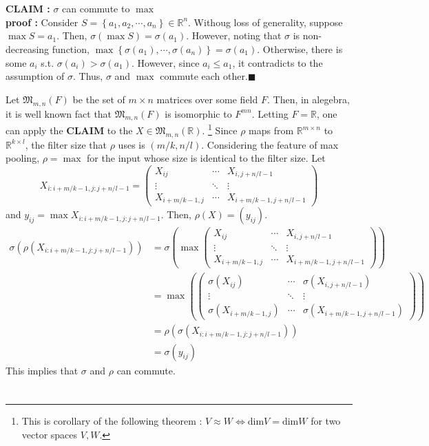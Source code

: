 \documentclass[10pt]{article}
\begin{document}
\section{}
\textbf{CLAIM : }$\sigma$ can commute to $\max$
\\
\textbf{proof : }
Consider $S = \left\{a_1,a_2,\cdots, a_n\right\}\in\mathbb{R}^n$. Withoug loss of generality, suppose $\max S = a_1$. Then, $\sigma(\max S) = \sigma(a_1)$. 
However, noting that $\sigma$ is non-decreasing function, $\max\left\{\sigma(a_1), \cdots,\sigma(a_n) \right\} = \sigma(a_1)$. Otherwise, there is some $a_i$ s.t. $\sigma(a_i) > \sigma(a_1)$. However, since $a_i\le a_1$, it contradicts to the assumption of $\sigma$.
Thus, $\sigma$ and $\max$ commute each other.$\blacksquare$

Let $\mathfrak{M}_{m,n}(F)$ be the set of $m\times n$ matrices over some field $F$. Then, in alegebra, it is well known fact that $\mathfrak{M}_{m,n}(F)$ is isomorphic to $F^{mn}$. Letting $F = \mathbb{R}$, one can apply the \textbf{CLAIM} to the $X\in\mathfrak{M}_{m,n}(\mathbb{R})$.
\footnote{This is corollary of the following theorem : $V \approx W \iff \text{dim}V = \text{dim}W$ for two vector spaces $V, W$.}
Since $\rho$ maps from $\mathbb{R}^{m\times n}$ to $\mathbb{R}^{k\times l}$, the filter size that $\rho$ uses is $(m/k, n/l)$. 
Considering the feature of max pooling, $\rho = \max$ for the input whose size is identical to the filter size. 
Let 
\begin{equation*}
    X_{i:i+m/k-1, j:j+n/l-1} = \begin{pmatrix}
        X_{ij} & \cdots & X_{i,j+n/l-1} \\ \vdots & \ddots & \vdots \\ X_{i+m/k-1,j} & \cdots & X_{i+m/k-1,j+n/l-1}
    \end{pmatrix}
\end{equation*}
and $y_{ij} = \max X_{i:i+m/k-1,j:j+n/l-1}$. Then, $\rho(X) = (y_{ij})$. 
\begin{align*}
    \sigma(\rho(X_{i:i+m/k-1,j:j+n/l-1})) &= \sigma\left(\max \begin{pmatrix}X_{ij} & \cdots & X_{i,j+n/l-1} \\ \vdots & \ddots & \vdots \\ X_{i+m/k-1,j} & \cdots & X_{i+m/k-1,j+n/l-1} \end{pmatrix}\right)
    \\ &= \max \left(\begin{pmatrix}
        \sigma(X_{ij}) & \cdots & \sigma(X_{i,j+n/l-1}) \\ \vdots & \ddots & \vdots \\ \sigma(X_{i+m/k-1,j}) & \cdots & \sigma(X_{i+m/k-1,j+n/l-1})
    \end{pmatrix}\right)
    \\ &= \rho(\sigma(X_{i:i+m/k-1,j:j+n/l-1}))
    \\ &= \sigma(y_{ij})
\end{align*}
This implies that $\sigma$ and $\rho$ can commute.

\section{}
\end{document}
